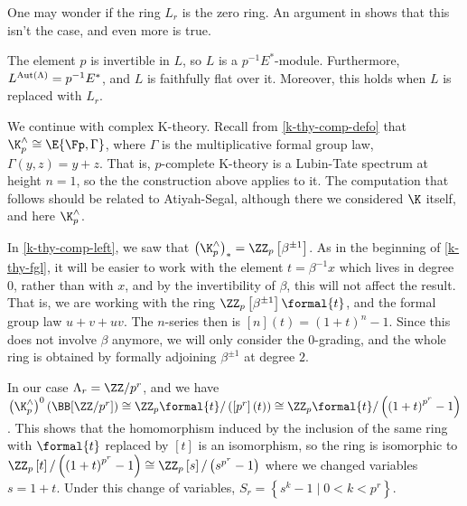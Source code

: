 One may wonder if the ring $L_r$ is the zero ring.
An argument in \cite{HKR} shows that this isn't the case, and even more is true.

\begin{proposition}\label{Lr-fixed-points}
	The element $p$ is invertible in $L$, so $L$ is a $p^{-1} E^*$-module.
	Furthermore, $L^{\operatorname{Aut} \left(\Lambda\right)} = p^{-1} E^*$, and $L$ is faithfully flat over it.
	Moreover, this holds when $L$ is replaced with $L_r$.
\end{proposition}

\begin{example}
	We continue with complex K-theory.
	Recall from \ref{k-thy-comp-defo} that $\K_p^\wedge \cong \E{\Fp, \Gamma}$, where $\Gamma$ is the multiplicative formal group law, $\Gamma\left(y,z\right) = y + z$.
	That is, $p$-complete K-theory is a Lubin-Tate spectrum at height $n = 1$, so the the construction above applies to it.
	The computation that follows should be related to Atiyah-Segal, although there we considered $\K$ itself, and here $\K_p^\wedge$.
	
	In \ref{k-thy-comp-left}, we saw that $\left(\K_p^\wedge\right)_* = \ZZ_p\left[\beta^{\pm 1}\right]$.
	As in the beginning of \ref{k-thy-fgl}, it will be easier to work with the element $t = \beta^{-1} x$ which lives in degree $0$, rather than with $x$, and by the invertibility of $\beta$, this will not affect the result.
	That is, we are working with the ring $\ZZ_p\left[\beta^{\pm 1}\right]\formal{t}$, and the formal group law $u + v + uv$.
	The $n$-series then is $\left[n\right]\left(t\right) = \left(1 + t\right)^n - 1$.
	Since this does not involve $\beta$ anymore, we will only consider the $0$-grading, and the whole ring is obtained by formally adjoining $\beta^{\pm 1}$ at degree $2$.
	
	In our case $\Lambda_r = \ZZ/p^r$, and we have
	$
	\left(\K_p^\wedge\right)^0\left(\BB[\ZZ/p^r]\right)
	\cong \ZZ_p\formal{t}/\left(\left[p^r\right]\left(t\right)\right)
	\cong \ZZ_p\formal{t}/\left(\left(1 + t\right)^{p^r} - 1\right)
	$.
	This shows that the homomorphism induced by the inclusion of the same ring with $\formal{t}$ replaced by $\left[t\right]$ is an isomorphism, so the ring is isomorphic to
	$
	\ZZ_p\left[t\right]/\left(\left(1 + t\right)^{p^r} - 1\right)
	\cong \ZZ_p\left[s\right]/\left(s^{p^r} - 1\right)
	$
	where we changed variables $s = 1+t$.
	Under this change of variables, $S_r = \left\{s^k - 1 \mid 0 < k < p^r\right\}$.
	

\end{example}
